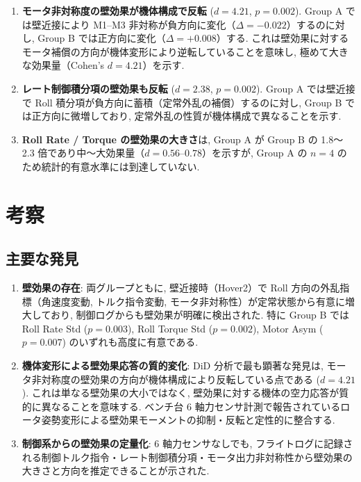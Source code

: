 \documentclass[11pt,a4paper]{ltjsarticle}
\begin{document}
\begin{enumerate}
    \item \textbf{モータ非対称度の壁効果が機体構成で反転} ($d = 4.21$, $p = 0.002$).
    Group A では壁近接により M1--M3 非対称が負方向に変化（$\Delta = -0.022$）するのに対し, Group B では正方向に変化（$\Delta = +0.008$）する. これは壁効果に対するモータ補償の方向が機体変形により逆転していることを意味し, 極めて大きな効果量（Cohen's $d = 4.21$）を示す.

    \item \textbf{レート制御積分項の壁効果も反転} ($d = 2.38$, $p = 0.002$).
    Group A では壁近接で Roll 積分項が負方向に蓄積（定常外乱の補償）するのに対し, Group B では正方向に微増しており, 定常外乱の性質が機体構成で異なることを示す.

    \item \textbf{Roll Rate / Torque の壁効果の大きさ}は, Group A が Group B の 1.8〜2.3 倍であり中〜大効果量（$d = 0.56$--$0.78$）を示すが, Group A の $n = 4$ のため統計的有意水準には到達していない.
\end{enumerate}

\section{考察}\label{sec:discussion}

\subsection{主要な発見}

\begin{enumerate}
    \item \textbf{壁効果の存在}: 両グループともに, 壁近接時（Hover2）で Roll 方向の外乱指標（角速度変動, トルク指令変動, モータ非対称性）が定常状態から有意に増大しており, 制御ログからも壁効果が明確に検出された. 特に Group B では Roll Rate Std ($p = 0.003$), Roll Torque Std ($p = 0.002$), Motor Asym ($p = 0.007$) のいずれも高度に有意である.

    \item \textbf{機体変形による壁効果応答の質的変化}: DiD 分析で最も顕著な発見は, モータ非対称度の壁効果の方向が機体構成により反転している点である ($d = 4.21$). これは単なる壁効果の大小ではなく, 壁効果に対する機体の空力応答が質的に異なることを意味する. ベンチ台 6 軸力センサ計測で報告されているロータ姿勢変形による壁効果モーメントの抑制・反転と定性的に整合する.

    \item \textbf{制御系からの壁効果の定量化}: 6 軸力センサなしでも, フライトログに記録される制御トルク指令・レート制御積分項・モータ出力非対称性から壁効果の大きさと方向を推定できることが示された.
\end{enumerate}
\end{document}
